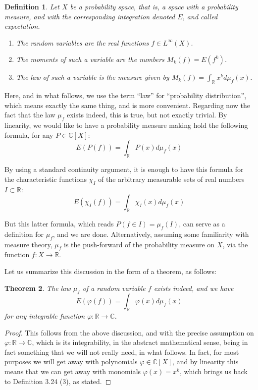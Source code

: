 \documentclass[12pt]{amsbook}
\newtheorem{theorem}{Theorem}[chapter]
\newtheorem{definition}[theorem]{Definition}
\begin{document}
\begin{definition}
Let $X$ be a probability space, that is, a space with a probability measure, and with the corresponding integration denoted $E$, and called expectation.
\begin{enumerate}
\item The random variables are the real functions $f\in L^\infty(X)$.

\item The moments of such a variable are the numbers $M_k(f)=E(f^k)$.

\item The law of such a variable is the measure given by $M_k(f)=\int_\mathbb Rx^kd\mu_f(x)$.
\end{enumerate}
\end{definition}

Here, and in what follows, we use the term ``law'' for ``probability distribution'', which means exactly the same thing, and is more convenient. Regarding now the fact that the law $\mu_f$ exists indeed, this is true, but not exactly trivial. By linearity, we would like to have a probability measure making hold the following formula, for any $P\in\mathbb C[X]$:
$$E(P(f))=\int_\mathbb RP(x)d\mu_f(x)$$

By using a standard continuity argument, it is enough to have this formula for the characteristic functions $\chi_I$ of the arbitrary measurable sets of real numbers $I\subset\mathbb R$:
$$E(\chi_I(f))=\int_\mathbb R\chi_I(x)d\mu_f(x)$$

But this latter formula, which reads $P(f\in I)=\mu_f(I)$, can serve as a definition for $\mu_f$, and we are done. Alternatively, assuming some familiarity with measure theory, $\mu_f$ is the push-forward of the probability measure on $X$, via the function $f:X\to\mathbb R$. 

\bigskip

Let us summarize this discussion in the form of a theorem, as follows:

\begin{theorem}
The law $\mu_f$ of a random variable $f$ exists indeed, and we have
$$E(\varphi(f))=\int_\mathbb R\varphi(x)d\mu_f(x)$$
for any integrable function $\varphi:\mathbb R\to\mathbb C$.
\end{theorem}

\begin{proof}
This follows from the above discussion, and with the precise assumption on $\varphi:\mathbb R\to\mathbb C$, which is its integrability, in the abstract mathematical sense, being in fact something that we will not really need, in what follows. In fact, for most purposes we will get away with polynomials $\varphi\in\mathbb C[X]$, and by linearity this means that we can get away with monomials $\varphi(x)=x^k$, which brings us back to Definition 3.24 (3), as stated.
\end{proof}
\end{document}
